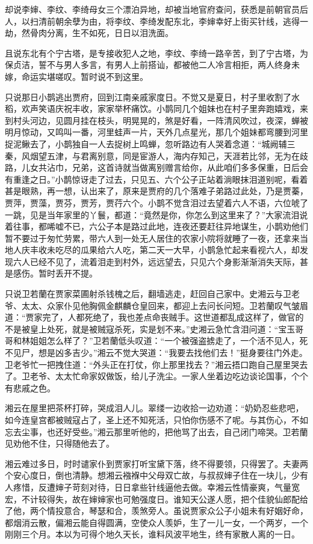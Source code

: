 \documentclass[12pt,oneside]{book}
\begin{document}
却说李婶、李纹、李绮母女三个漂泊异地，却被当地官府查问，获悉是前朝官员后人，以扫清前朝余孽为由，将李纹、李绮发配东北，李婶幸好上街买针线，逃得一劫，然骨肉分离，生不如死，日日以泪洗面。

且说东北有个宁古塔，是专接收犯人之地，李纹、李绮一路辛苦，到了宁古塔，为保贞洁，誓不与男人多言，有男人上前搭讪，都被他二人冷言相拒，两人终身未嫁，命运实堪嗟叹。暂时说不到这里。

只说那日小鹊逃出贾府，回到江南亲戚家度日。不觉又是夏日，村子里收割了水稻，欢声笑语庆祝丰收，家家举杯痛饮。小鹊同几个姐妹也在村子里奔跑嬉戏，来到村头河边，见圆月挂在枝头，明晃晃的，煞是好看，一阵清风吹过，夜深，蝉被明月惊动，又鸣叫一番，河里蛙声一片，天外几点星光，那几个姐妹都弯腰到河里捉泥鳅去了，小鹊独自一人去捉树上鸣蝉，忽听路边有人哭着念道：“城阙辅三秦，风烟望五津，与君离别意，同是宦游人，海内存知己，天涯若比邻，无为在歧路，儿女共沾巾，兄弟，这首诗就当做离别赠言给你，从此咱们多多保重，日后会有重逢之日。”小鹊惊讶走了过去，只见五、六个公子正站着淌眼抹泪道别呢，看着甚是眼熟，再一想，认出来了，原来是贾府的几个落难子弟路过此处，乃是贾蓁，贾萍，贾藻，贾芬，贾芳，贾荇六个。小鹊不觉含泪过去望着六人不语，六位唬了一跳，见是当年家里的丫鬟，都道：“竟然是你，你怎么到这里来了？”大家流泪说着往事，都唏嘘不已，六公子本是路过此地，连夜还要赶往异地谋生，小鹊劝他们暂不要过于匆忙劳累，带六人到一处无人居住的农家小院将就睡了一夜，还拿来当地人庆丰收未吃尽的瓜果给六人吃，第二天一大早，小鹊急忙起来看视六人，却发现六人已经不见了，流着泪走到村外，远远望去，只见六个身影渐渐消失天际，甚是感伤。暂时丢开不提。

只说卫若蘭在贾家菜圃射杀钱槐之后，翻墙逃走，赶回自己家中。史湘云与卫老爷、太太、众家仆见他胸佩金麒麟仓皇回来，都迎上去问长问短。卫若蘭叹气皱眉道：“贾家完了，人都死绝了，我也差点命丧贼手。这世道都乱成这样了，做官的不是被皇上处死，就是被贼寇杀死，实是划不来。”史湘云急忙含泪问道：“宝玉哥哥和林姐姐怎么样了？”卫若蘭低头叹道：“一个被强盗掳走了，一个活不见人，死不见尸，想是凶多吉少。”湘云不觉大哭道：“我要去找他们去！”挺身要往门外走。卫老爷忙一把拽住道：“外头正在打仗，你上那里找去？”湘云捂口跑自己屋里哭去了。卫老爷、太太忙命家奴做饭，给儿子洗尘。一家人坐着边吃边谈论国事，个个有悲戚之色。

湘云在屋里把茶杯打碎，哭成泪人儿。翠缕一边收拾一边劝道：“奶奶忍些悲吧，如今连皇宫都被贼寇占了，圣上还不知死活，只怕你伤感不了呢。与其伤心，不如忘去尘事，也还好受些。”湘云那里听他的，把他骂了出去，自己闭门啼哭。卫若蘭见劝他不住，只得随他去了。

湘云难过多日，时时谴家仆到贾家打听宝黛下落，终不得要领，只得罢了。夫妻两个安心度日，倒也清静。想湘云襁褓中父母双亡故，与叔叔婶子住在一块儿，少有人疼惜，反遭婶子苛刻对待，日日拿些针线逼他去做。幸湘云性情豪爽，气量宽宏，不计较得失，故在婶婶家也可勉强度日。谁知天公遂人愿，把个佳貌仙郎配给了他，两个情投意合，琴瑟和合，羡煞旁人。虽说贾家众公子小姐未有好姻好命，都烟消云散，偏湘云能自得圆满，空使众人羡妒，生了一儿一女，一个两岁，一个刚刚三个月。本以为可得个地久天长，谁料风波平地生，终有家散人离的一日。
\end{document}
